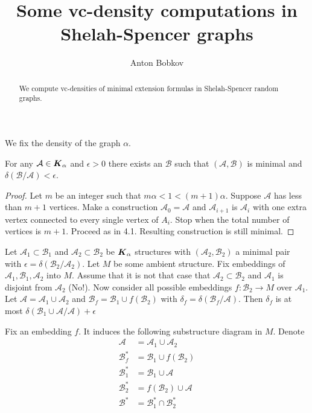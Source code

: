 \documentclass{amsart}
\newcommand{\A}{\mathcal A}
\newcommand{\B}{\mathcal B}
\newcommand{\K}{\boldface K_\alpha}
\begin{document}
\title{Some vc-density computations in Shelah-Spencer graphs}
\author{Anton Bobkov}

\begin{abstract}
	We compute vc-densities of minimal extension formulas in Shelah-Spencer random graphs.
\end{abstract}

\maketitle

We fix the density of the graph $\alpha$.

\begin{Lemma}
	For any $\A \in \K$ and $\epsilon > 0$ there exists an $\B$ such that $(\A, \B)$ is minimal and $\delta(\B/\A) < \epsilon$.
\end{Lemma}

\begin{proof}
	Let $m$ be an integer such that $m\alpha < 1 < (m+1)\alpha$. Suppose $\A$ has less than $m+1$ vertices. Make a construction $\A_0 = \A$ and $\A_{i+1}$ is $\A_i$ with one extra vertex connected to every single vertex of $A_i$. Stop when the total number of vertices is $m+1$. Proceed as in \cite{Laskowski} 4.1. Resulting construction is still minimal.
\end{proof}

\begin{Lemma}
	Let $\A_1 \subset \B_1$ and $\A_2 \subset \B_2$ be $\K$ structures with $(\A_2, \B_2)$ a minimal pair with $\epsilon = \delta (\B_2/\A_2)$. Let $M$ be some ambient structure. Fix embeddings of $\A_1, \B_1, \A_2$ into $M$. Assume that it is not that case that $\A_2 \subset \B_2$ and $\A_1$ is disjoint from $\A_2$ (No!). Now consider all possible embeddings $f \colon \B_2 \to M$ over $\A_1$.  Let $\A = \A_1 \cup \A_2$ and $\B_f = \B_1 \cup f(\B_2)$ with $\delta_f = \delta(\B_f/\A)$. Then $\delta_f$ is at most $\delta(\B_1 \cup \A/\A) + \epsilon$
\end{Lemma}

Fix an embedding $f$. It induces the following substructure diagram in $M$. Denote 
\begin{align*}
	\A &= \A_1 \cup \A_2 \\
	\B_f^* &= \B_1 \cup f(\B_2) \\
	\B_1^* &= \B_1 \cup \A \\
	\B_2^* &= f(\B_2) \cup \A \\
	\B^* &= \B_1^* \cap \B_2^*
\end{align*}
\end{document}
